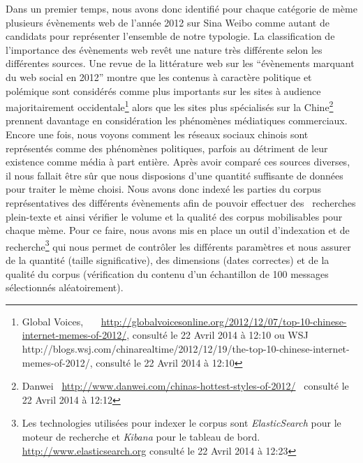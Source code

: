Dans un premier temps, nous avons donc identifié pour chaque
catégorie de mème plusieurs évènements web de
l{\textquoteright}année 2012 sur Sina Weibo comme autant de candidats
pour représenter l{\textquoteright}ensemble de notre typologie. La
classification de l{\textquoteright}importance des évènements web
rev\^et une nature très différente selon les différentes sources.
Une revue de la littérature web sur les
{\textquotedblleft}évènements marquant du web social en
2012{\textquotedblright} montre que les contenus à caractère
politique et polémique sont considérés comme plus importants sur
les sites à audience majoritairement occidentale\footnote{ Global
Voices,
\ \ \ \url{http://globalvoicesonline.org/2012/12/07/top-10-chinese-internet-memes-of-2012/,}
consulté le 22 Avril 2014 à 12:10 ou WSJ
http://blogs.wsj.com/chinarealtime/2012/12/19/the-top-10-chinese-internet-memes-of-2012/,
consulté le 22 Avril 2014 à 12:10 } alors que les sites plus
spécialisés sur la Chine\footnote{ Danwei
\ \url{http://www.danwei.com/chinas-hottest-styles-of-2012/}
\ consulté le 22 Avril 2014 à 12:12} prennent davantage en
considération les phénomènes médiatiques commerciaux. Encore
une fois, nous voyons comment les réseaux sociaux chinois sont
représentés comme des phénomènes politiques, parfois au
détriment de leur existence comme média à part entière. Après
avoir comparé ces sources diverses, il nous fallait \^etre s\^ur que
nous disposions d{\textquoteright}une quantité suffisante de
données pour traiter le mème choisi. Nous avons donc indexé les
parties du corpus représentatives des différents évènements
afin de pouvoir effectuer des \ recherches plein-texte et ainsi
vérifier le volume et la qualité des corpus mobilisables pour
chaque mème. Pour ce faire, nous avons mis en place un outil
d{\textquoteright}indexation et de recherche\footnote{ Les technologies
utilisées pour indexer le corpus sont \textit{ElasticSearch }pour le
moteur de recherche et \textit{Kibana} pour le tableau de bord.
\url{http://www.elasticsearch.org} consulté le 22 Avril 2014 à
12:23} qui nous permet de contr\^oler les différents paramètres et
nous assurer de la quantité (taille significative), des dimensions
(dates correctes) et de la qualité du corpus (vérification du
contenu d{\textquoteright}un échantillon de 100 messages
sélectionnés aléatoirement).


